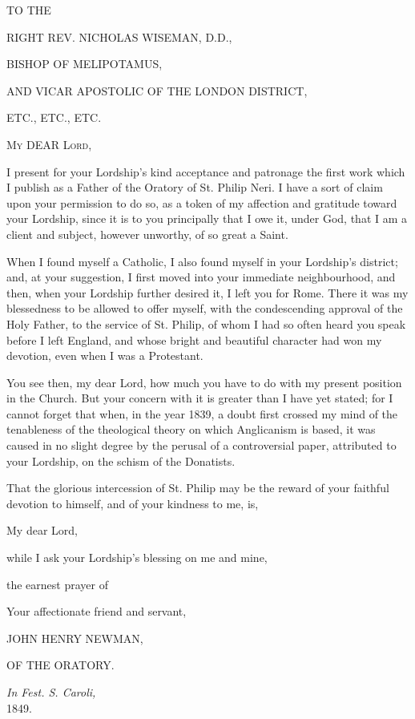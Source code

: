 



TO THE

RIGHT REV. NICHOLAS WISEMAN, D.D.,

BISHOP OF MELIPOTAMUS,

AND VICAR APOSTOLIC OF THE LONDON DISTRICT,

ETC., ETC., ETC.


M\textsc{y} DEAR L\textsc{ord},

I present for your Lordship's kind acceptance and patronage the
first work which I publish as a Father of the Oratory of St. Philip
Neri. I have a sort of claim upon your permission to do so, as a token
of my affection and gratitude toward your Lordship, since it is to you
principally that I owe it, under God, that I am a client and subject,
however unworthy, of so great a Saint.


When I found myself a Catholic, I also found myself in your
Lordship's district; and, at your suggestion, I first moved into your
immediate neighbourhood, and then, when your Lordship further desired
it, I left you for Rome. There it was my blessedness to be allowed to
offer myself, with the condescending approval of the Holy Father, to
the service of St. Philip, of whom I had so often heard you speak
before I left England, and whose bright and beautiful character had
won my devotion, even when I was a Protestant.


You see then, my dear Lord, how much you have to do with my present
position in the Church. But your concern with it is greater than I
have yet stated; for I cannot forget that when, in the year 1839, a
doubt first crossed my mind of the tenableness of the theological
theory on which Anglicanism is based, it was caused in no slight
degree by the perusal of a controversial paper, attributed to your
Lordship, on the schism of the Donatists.


That the glorious intercession of St. Philip may be the reward of
your faithful devotion to himself, and of your kindness to me, is,

My dear Lord,

while I ask your Lordship's blessing on me and mine,

the earnest prayer of

Your affectionate friend and servant,

JOHN HENRY NEWMAN,

OF THE ORATORY.


\emph{In Fest. S. Caroli,}\\
1849.

